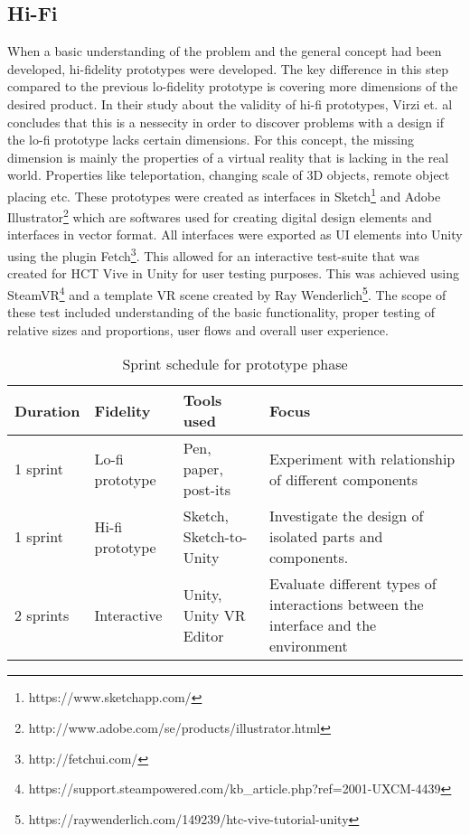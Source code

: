 \subsection{Hi-Fi}
\label{method:prototype:hifi}
When a basic understanding of the problem and the general concept had been developed, hi-fidelity prototypes were developed. The key difference in this step compared to the previous lo-fidelity prototype is covering more dimensions of the desired product. In their study about the validity of hi-fi prototypes, Virzi et. al concludes that this is a nessecity in order to discover problems with a design if the lo-fi prototype lacks certain dimensions\cite{proto:virzi1996usability}. For this concept, the missing dimension is mainly the properties of a virtual reality that is lacking in the real world. Properties like teleportation, changing scale of 3D objects, remote object placing etc.
These prototypes were created as interfaces in  Sketch\footnote{https://www.sketchapp.com/} and Adobe Illustrator\footnote{http://www.adobe.com/se/products/illustrator.html} which are softwares used for creating digital design elements and interfaces in vector format. All interfaces were exported as UI elements into Unity using the plugin Fetch\footnote{http://fetchui.com/}. This allowed for an interactive test-suite that was created for HCT Vive in Unity for user testing purposes.
This was achieved using SteamVR\footnote{https://support.steampowered.com/kb\_article.php?ref=2001-UXCM-4439} and a template VR scene created by Ray Wenderlich\footnote{https://raywenderlich.com/149239/htc-vive-tutorial-unity}. The scope of these test included understanding of the basic functionality, proper testing of relative sizes and proportions, user flows and overall user experience.

\begin{table}[]
  \centering
  \caption{Sprint schedule for prototype phase}
  \label{table:sprints}
  \begin{tabular}{|l|l|l| p{5cm}|}
     \hline
    \textbf{Duration} & \textbf{Fidelity} & \textbf{Tools used} & \textbf{Focus} \\\hline
    1 sprint                         & Lo-fi prototype  & Pen, paper, post-its    & Experiment with relationship of different components                               \\\hline
    1 sprint                        & Hi-fi prototype & Sketch, Sketch-to-Unity & Investigate the design of isolated parts and components.                           \\\hline
    2 sprints                 & Interactive   & Unity, Unity VR Editor  & Evaluate different types of interactions between the interface and the environment  \\\hline
  \end{tabular}
\end{table}

